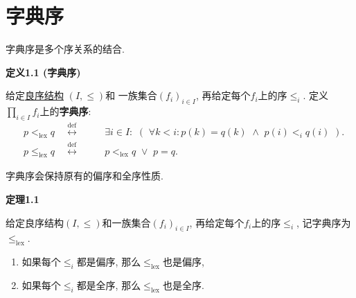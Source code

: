 


\setlength{\abovedisplayskip}{1pt}
\setlength{\belowdisplayskip}{1pt}

\section{字典序}

字典序是多个序关系的结合.

\vspace{10pt}

\hypertarget{sec:定义1.1}{}
\noindent\textbf{定义1.1 (字典序)}

给定\href{04 良序关系#nameddest=sec:定义1.1}{良序结构} $(I,\leqslant)$和
一族集合$(f_i)_{i\in I}$, 再给定每个$f_i$上的序$\leqslant_i$.
定义$\displaystyle\prod_{i\in I}f_i$上的\textbf{字典序}:
\[\begin{aligned}
    &p<_{\mathrm{lex}}q\quad\overset{\mathrm{def}}{\leftrightarrow}\quad&&
    \exists i\in I:\,\,(\,\,\forall k<i:p(k)=q(k)\,\,\land\,\,p(i)<_iq(i)\,\,).
    \\[-3pt]
    &p\leqslant_{\mathrm{lex}}q\quad\overset{\mathrm{def}}{\leftrightarrow}\quad
    &&p<_{\mathrm{lex}}q\,\,\lor\,\,p=q.
\end{aligned}\]

\vspace{10pt}

字典序会保持原有的偏序和全序性质.

\vspace{10pt}

\hypertarget{sec:定理1.1}{}
\noindent\textbf{定理1.1}

给定良序结构$(I,\leqslant)$和一族集合$(f_i)_{i\in I}$,
再给定每个$f_i$上的序$\leqslant_i$, 记字典序为$\leqslant_{\mathrm{lex}}$.

\begin{enumerate}
    \item 如果每个$\leqslant_i$都是偏序, 那么$\leqslant_{\mathrm{lex}}$也是偏序,
    \item 如果每个$\leqslant_i$都是全序, 那么$\leqslant_{\mathrm{lex}}$也是全序.
\end{enumerate}


